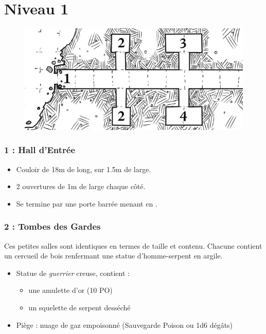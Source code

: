 \chapter{Niveau 1}
\begin{figure}[b]
  \centering
  \includegraphics[width=0.7\linewidth]{pics/map_1-4.jpg}
\end{figure}
\subsection{1 : Hall d’Entrée}\label{n1:s1}
\begin{itemize}
  \item Couloir de 18m de long, sur 1.5m de large.
  \item 2 ouvertures de 1m de large chaque côté.
  \item Se termine par une porte barrée menant en \textbf{}.
\end{itemize}

\subsection{2 : Tombes des Gardes}\label{n1:s2}
Ces petites salles sont identiques en termes de taille et contenu.
Chacune contient un cercueil de bois renfermant une statue d'homme-serpent en argile.

\begin{itemize}
  \item Statue de \emph{guerrier} creuse, contient :
  \begin{itemize}
    \item une amulette d’or (10 PO)
    \item un squelette de serpent desséché
  \end{itemize}
  \item Piège : nuage de gaz empoisonné (Sauvegarde Poison ou 1d6 dégâts)
\end{itemize}

%
\vfill\break
